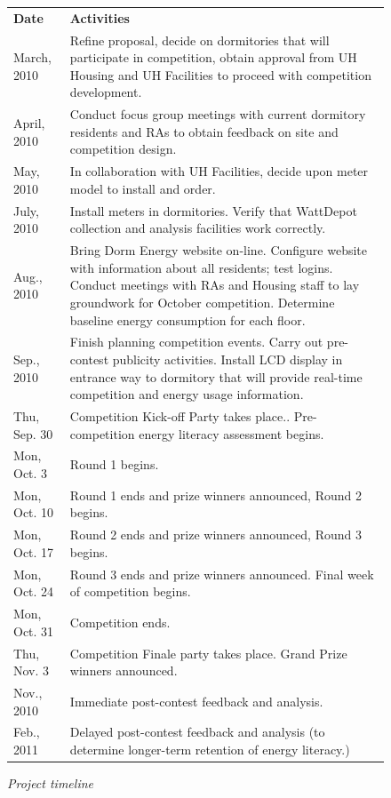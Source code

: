 \documentclass[11pt]{article}
\begin{document}
\begin{figure}[!ht]
\small
\begin{tabular}{p{1in}p{5in}} \hline
{\bf Date} & {\bf Activities}  \\
March, 2010 &  Refine proposal, decide on dormitories that will
participate in competition, obtain approval from UH Housing and UH Facilities to proceed with competition development. \\

April, 2010 & Conduct focus group meetings with current
dormitory residents and RAs to obtain feedback on site and competition
design. \\

May, 2010 &  In collaboration with UH Facilities, decide upon meter model to install and order. \\

July, 2010 & Install meters in dormitories.  Verify that WattDepot collection and analysis facilities work correctly. \\

Aug., 2010 & Bring Dorm Energy website on-line.  Configure website with information about all residents; test logins.  Conduct meetings with RAs and Housing staff to lay groundwork for October competition. Determine baseline energy consumption for each floor.\\

Sep., 2010 & Finish planning competition events.  Carry out pre-contest publicity activities.  Install LCD display in entrance way to dormitory that will provide real-time competition and energy usage information.    \\

Thu, Sep. 30 & Competition Kick-off Party takes place..  Pre-competition energy literacy assessment begins. \\

Mon, Oct. 3 & Round 1 begins. \\

Mon, Oct. 10 & Round 1 ends and prize winners announced, Round 2 begins. \\

Mon, Oct. 17 & Round 2 ends and prize winners announced, Round 3 begins. \\

Mon, Oct. 24 & Round 3 ends and prize winners announced. Final week of competition begins. \\

Mon, Oct. 31 & Competition ends.  \\

Thu, Nov. 3 & Competition Finale party takes place. Grand Prize winners announced. \\

Nov., 2010 &  Immediate post-contest feedback and analysis.  \\

Feb., 2011 &  Delayed post-contest feedback and analysis (to determine longer-term retention of energy literacy.)  \\ \hline
\end{tabular} 
\normalsize
\caption{{\em Project timeline}}
\label{fig:timeline}
\end{figure}
\end{document}
